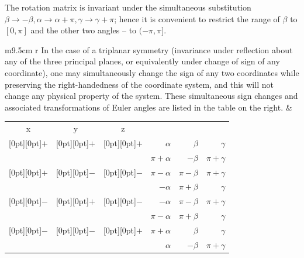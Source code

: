 \documentclass[12pt]{article}
\begin{document}
The rotation matrix is invariant under the simultaneous substitution $\beta \to -\beta, \alpha \to \alpha+\pi, \gamma \to \gamma+\pi$; hence it is convenient to restrict the range of $\beta$ to $[0,\pi]$ and the other two angles -- to $(-\pi,\pi]$.\\
\makebox[-2mm]{}\begin{tabular}{m{9.5cm} r}
In the case of a triplanar symmetry (invariance under reflection about any of the three principal planes, or equivalently under change of sign of any coordinate), one may simultaneously change the sign of any two coordinates while preserving the right-handedness of the coordinate system, and this will not change any physical property of the system. These simultaneous sign changes and associated transformations of Euler angles are listed in the table on the right.
&
\begin{tabular}{c c c r r r}
x & y & z & & \makebox[0pt][r]{angles} \\
\raisebox{-8pt}[0pt][0pt]{$+$} & \raisebox{-8pt}[0pt][0pt]{$+$} & \raisebox{-8pt}[0pt][0pt]{$+$}
&   $\alpha$ & $\beta$ & $\gamma$ \\
&&& $\pi+\alpha$ & $-\beta$ & $\pi+\gamma$ \\
\raisebox{-8pt}[0pt][0pt]{$+$} & \raisebox{-8pt}[0pt][0pt]{$-$} & \raisebox{-8pt}[0pt][0pt]{$-$}
&   $\pi-\alpha$ & $\pi-\beta$ & $\pi+\gamma$ \\
&&& $-\alpha$ & $\pi+\beta$ & $\gamma$ \\
\raisebox{-8pt}[0pt][0pt]{$-$} & \raisebox{-8pt}[0pt][0pt]{$+$} & \raisebox{-8pt}[0pt][0pt]{$-$}
&   $-\alpha$ & $\pi-\beta$ & $\pi+\gamma$ \\
&&& $\pi-\alpha$ & $\pi+\beta$ & $\gamma$ \\
\raisebox{-8pt}[0pt][0pt]{$-$} & \raisebox{-8pt}[0pt][0pt]{$-$} & \raisebox{-8pt}[0pt][0pt]{$+$}
&   $\pi+\alpha$ & $\beta$ & $\gamma$ \\
&&& $\alpha$ & $-\beta$ & $\pi+\gamma$
\end{tabular}
\end{tabular}
\end{document}
